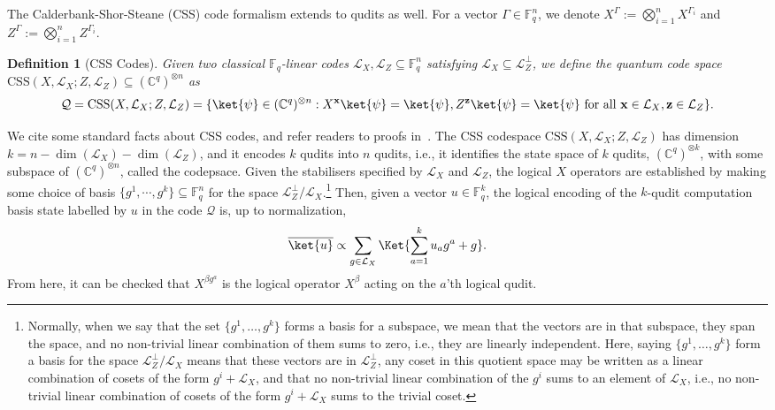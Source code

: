 \documentclass[11pt]{article}
\newtheorem{definition}[theorem]{Definition}
\theoremstyle{definition}
\newcommand{\CSS}{\text{CSS}}
\newcommand{\cL}{\mathcal{L}}
\newcommand{\bx}{\mathbf{x}}
\newcommand{\bz}{\mathbf{z}}
\newcommand{\qcode}{\mathcal{Q}}
\newcommand{\CC}{\mathbb{C}}
\newcommand{\FF}{\mathbb{F}}
\newcommand*{\ol}{\overline}
\begin{document}
The Calderbank-Shor-Steane (CSS) code formalism extends to qudits as well. 
For a vector $\Gamma\in \FF_q^n$, we denote
$X^\Gamma := \bigotimes_{i=1}^n X^{\Gamma_i}$ and $Z^\Gamma := \bigotimes_{i=1}^n Z^{\Gamma_i}$.
\begin{definition}[CSS Codes]
Given two classical $\mathbb{F}_q$-linear codes $\cL_X, \cL_Z\subseteq \FF_q^n$ satisfying $\cL_X\subseteq \cL_Z^\perp$, we define the quantum code space $\CSS(X, \cL_X; Z, \cL_Z) \subseteq (\CC^q)^{\otimes n}$ as
\begin{align}
    \qcode = \CSS(X, \cL_X; Z, \cL_Z)
    = \{\ket{\psi}\in (\CC^q)^{\otimes n}: X^{\bx}\ket{\psi} = \ket{\psi}, Z^{\bz}\ket{\psi} = \ket{\psi} 
    \text{ for all } \bx\in \cL_X, \bz\in \cL_Z\}.
\end{align}
\end{definition}
We cite some standard facts about CSS codes, and refer readers to proofs in~\cite{gottesman2016surviving}.
The CSS codespace $\CSS(X, \cL_X; Z, \cL_Z)$ has dimension $k = n - \dim(\cL_X) - \dim(\cL_Z)$, and it encodes $k$ qudits into $n$ qudits, i.e., it identifies the state space of $k$ qudits, $(\mathbb{C}^q)^{\otimes k}$, with some subspace of $(\mathbb{C}^q)^{\otimes n}$, called the codepsace. Given the stabilisers specified by $\mathcal{L}_X$ and $\mathcal{L}_Z$, the logical $X$ operators are established by making some choice of basis $\{g^1, \cdots, g^k\}\subseteq \FF_q^n$ for the space $\cL_Z^\perp/\cL_X$.\footnote{Normally, when we say that the set $\{g^1, \ldots, g^k\}$ forms a basis for a subspace, we mean that the vectors are in that subspace, they span the space, and no non-trivial linear combination of them sums to zero, i.e., they are linearly independent. Here, saying $\{g^1, \ldots, g^k\}$ form a basis for the space $\mathcal{L}_Z^\perp/\mathcal{L}_X$ means that these vectors are in $\mathcal{L}_Z^\perp$, any coset in this quotient space may be written as a linear combination of cosets of the form $g^i + \mathcal{L}_X$, and that no non-trivial linear combination of the $g^i$ sums to an element of $\mathcal{L}_X$, i.e., no non-trivial linear combination of cosets of the form $g^i+\mathcal{L}_X$ sums to the trivial coset.} 
Then, given a vector $u\in \FF_q^k$, the logical encoding of the $k$-qudit computation basis state labelled by $u$ in the code $\qcode$ is, up to normalization,
\begin{align}
    \ol{\ket{u}} \propto \sum_{g\in \cL_X} \Ket{\sum_{a=1}^k u_ag^a + g}. 
\end{align}
From here, it can be checked that $X^{\beta g^a}$ is the logical operator $X^\beta$ acting on the $a$'th logical qudit.
\end{document}
